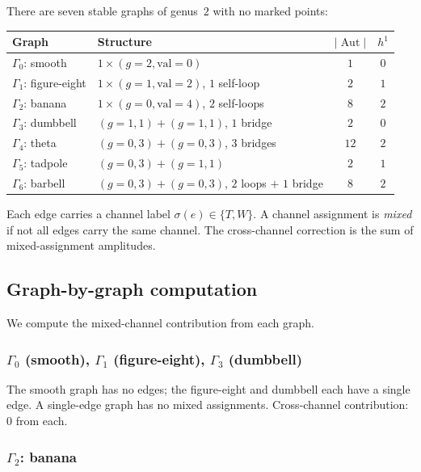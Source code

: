 \documentclass[11pt,reqno]{amsart}
\theoremstyle{definition}
\theoremstyle{remark}
\DeclareMathOperator{\Aut}{Aut}
\numberwithin{equation}{section}
\begin{document}
There are seven stable graphs of genus~$2$ with no marked
points:

\begin{center}
\renewcommand{\arraystretch}{1.2}
\small
\begin{tabular}{llcc}
\toprule
Graph & Structure & $|\Aut|$ & $h^1$ \\
\midrule
$\Gamma_0$: smooth
 & $1 \times (g{=}2, \text{val}=0)$ & $1$ & $0$ \\
$\Gamma_1$: figure-eight
 & $1 \times (g{=}1, \text{val}=2)$, $1$ self-loop
 & $2$ & $1$ \\
$\Gamma_2$: banana
 & $1 \times (g{=}0, \text{val}=4)$, $2$ self-loops
 & $8$ & $2$ \\
$\Gamma_3$: dumbbell
 & $(g{=}1,1) + (g{=}1,1)$, $1$ bridge
 & $2$ & $0$ \\
$\Gamma_4$: theta
 & $(g{=}0,3) + (g{=}0,3)$, $3$ bridges
 & $12$ & $2$ \\
$\Gamma_5$: tadpole
 & $(g{=}0,3) + (g{=}1,1)$
 & $2$ & $1$ \\
$\Gamma_6$: barbell
 & $(g{=}0,3) + (g{=}0,3)$, $2$ loops $+$ $1$ bridge
 & $8$ & $2$ \\
\bottomrule
\end{tabular}
\end{center}

\noindent Each edge carries a channel label
$\sigma(e) \in \{T, W\}$. A channel assignment is
\emph{mixed} if not all edges carry the same channel.
The cross-channel correction is the sum of mixed-assignment
amplitudes.

\subsection{Graph-by-graph
computation}\label{subsec:graph-by-graph}

We compute the mixed-channel contribution from each graph.

\subsubsection*{$\Gamma_0$ (smooth), $\Gamma_1$
(figure-eight), $\Gamma_3$ (dumbbell)}

The smooth graph has no edges; the figure-eight and dumbbell
each have a single edge. A single-edge graph has no mixed
assignments. Cross-channel contribution: $0$ from each.

\subsubsection*{$\Gamma_2$: banana}
\end{document}
